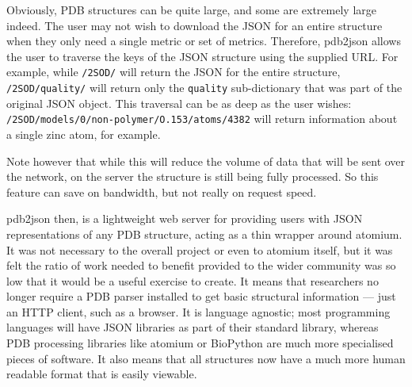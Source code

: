 Obviously, PDB structures can be quite large, and some are extremely large indeed. The user may not wish to download the JSON for an entire structure when they only need a single metric or set of metrics. Therefore, pdb2json allows the user to traverse the keys of the JSON structure using the supplied URL. For example, while \texttt{/2SOD/} will return the JSON for the entire structure, \texttt{/2SOD/quality/} will return only the \texttt{quality} sub-dictionary that was part of the original JSON object. This traversal can be as deep as the user wishes: \texttt{/2SOD/models/0/non-polymer/O.153/atoms/4382} will return information about a single zinc atom, for example.

Note however that while this will reduce the volume of data that will be sent over the network, on the server the structure is still being fully processed. So this feature can save on bandwidth, but not really on request speed.

pdb2json then, is a lightweight web server for providing users with JSON representations of any PDB structure, acting as a thin wrapper around atomium. It was not necessary to the overall project or even to atomium itself, but it was felt the ratio of work needed to benefit provided to the wider community was so low that it would be a useful exercise to create. It means that researchers no longer require a PDB parser installed to get basic structural information --- just an HTTP client, such as a browser. It is language agnostic; most programming languages will have JSON libraries as part of their standard library, whereas PDB processing libraries like atomium or BioPython are much more specialised pieces of software. It also means that all structures now have a much more human readable format that is easily viewable.

